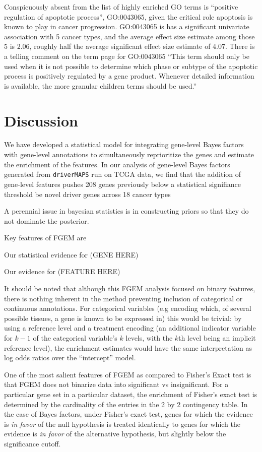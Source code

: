 Conspicuously absent from the list of highly enriched GO terms is ``positive regulation of apoptotic process'', GO:0043065, given the critical role apoptosis is known to play in cancer progression. GO:0043065 is has a significant univariate association with 5 cancer types, and the average effect size estimate among those 5 is 2.06, roughly half the average significant effect size estimate of 4.07. There is a telling comment on the term page for GO:0043065 ``This term should only be used when it is not possible to determine which phase or subtype of the apoptotic process is positively regulated by a gene product. Whenever detailed information is available, the more granular children terms should be used.''

\section{Discussion}\label{sec:org3165b14}

We have developed a statistical model for integrating gene-level Bayes factors with gene-level annotations to simultaneously reprioritize the genes and estimate the enrichment of the features. In our analysis of gene-level Bayes factors generated from \texttt{driverMAPS} run on TCGA data, we find that the addition of gene-level features pushes 208 genes previously below a statistical signifiance threshold be novel driver genes across 18 cancer types


A perennial issue in bayesian statistics is in constructing priors so that they do not dominate the posterior.

Key features of FGEM are

Our statistical evidence for (GENE HERE)

Our evidence for (FEATURE HERE)

It should be noted that although this FGEM analysis focused on binary features, there is nothing inherent in the method preventing inclusion of categorical or continuous annotations.  For categorical variables (e.g encoding which, of several possible tissues, a gene is known to be expressed in) this would be
trivial: by using a reference level \cite{chambers1992statistical} and a treatment encoding (an additional indicator variable for $k-1$ of the categorical variable's $k$ levels, with the $k$th level being an implicit reference level), the enrichment estimates would have the same interpretation as log odds ratios over the ``intercept'' model.

One of the most salient features of FGEM as compared to Fisher's Exact test is that FGEM does not binarize data into significant vs insignificant.  For a particular gene set in a particular dataset, the enrichment of Fisher's exact test is determined by the cardinality of the entries in the 2 by 2 contingency table.  In the case of Bayes factors, under Fisher's exact test, genes for which the evidence is \emph{in favor} of the null hypothesis is treated identically to genes for which the evidence is \emph{in favor} of the alternative hypothesis, but slightly below the significance cutoff. 


